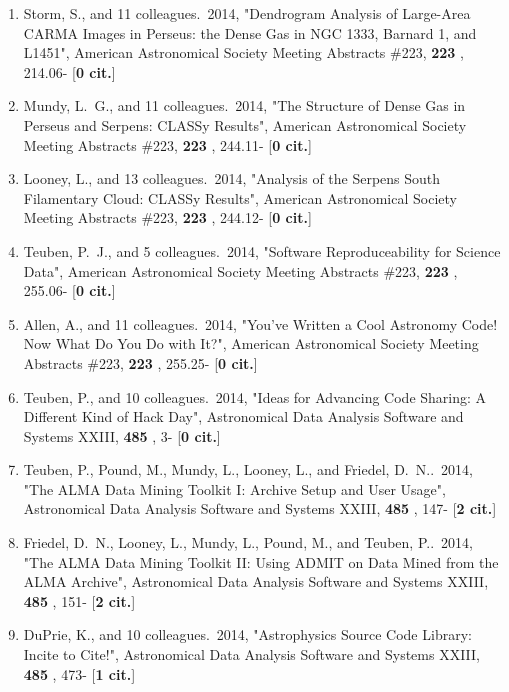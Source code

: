\documentclass[11pt,letterpaper]{article}
\begin{document}
\begin{enumerate}[resume,label=\textbf{\arabic*}.]
\item  
Storm, S., and 11 colleagues.\  2014,  "Dendrogram Analysis of Large-Area 
CARMA Images in Perseus: the Dense Gas in NGC 1333, Barnard 1, and L1451", 
American Astronomical Society Meeting Abstracts \#223,  {\bf 223} , 214.06- 
[{\bf 0 cit.}] 

\item  
Mundy, L.~G., and 11 colleagues.\  2014,  "The Structure of Dense Gas in 
Perseus and Serpens: CLASSy Results", American Astronomical Society Meeting 
Abstracts \#223,  {\bf 223} , 244.11- [{\bf 0 cit.}] 

\item  
Looney, L., and 13 colleagues.\  2014,  "Analysis of the Serpens South 
Filamentary Cloud: CLASSy Results", American Astronomical Society Meeting 
Abstracts \#223,  {\bf 223} , 244.12- [{\bf 0 cit.}] 

\item  
Teuben, P.~J., and 5 colleagues.\  2014,  "Software Reproduceability for 
Science Data", American Astronomical Society Meeting Abstracts \#223,  {\bf 
223} , 255.06- [{\bf 0 cit.}] 

\item  
Allen, A., and 11 colleagues.\  2014,  "You've Written a Cool Astronomy 
Code! Now What Do You Do with It?", American Astronomical Society Meeting 
Abstracts \#223,  {\bf 223} , 255.25- [{\bf 0 cit.}] 

\item  
Teuben, P., and 10 colleagues.\  2014,  "Ideas for Advancing Code Sharing: 
A Different Kind of Hack Day", Astronomical Data Analysis Software and 
Systems XXIII,  {\bf 485} , 3- [{\bf 0 cit.}] 

\item  
Teuben, P., Pound, M., Mundy, L., Looney, L., and Friedel, D.~N..\  2014,  
"The ALMA Data Mining Toolkit I: Archive Setup and User Usage", 
Astronomical Data Analysis Software and Systems XXIII,  {\bf 485} , 147- 
[{\bf 2 cit.}] 

\item  
Friedel, D.~N., Looney, L., Mundy, L., Pound, M., and Teuben, P..\  2014,  
"The ALMA Data Mining Toolkit II: Using ADMIT on Data Mined from the ALMA 
Archive", Astronomical Data Analysis Software and Systems XXIII,  {\bf 485} 
, 151- [{\bf 2 cit.}] 

\item  
DuPrie, K., and 10 colleagues.\  2014,  "Astrophysics Source Code Library: 
Incite to Cite!", Astronomical Data Analysis Software and Systems XXIII,  
{\bf 485} , 473- [{\bf 1 cit.}] 


\end{enumerate}
\end{document}

